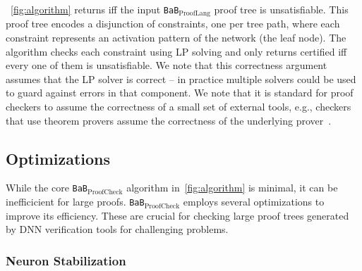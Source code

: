 \documentclass[oneside,11pt,dvipsnames]{book}
\numberwithin{equation}{section}
\theoremstyle{definition}
\theoremstyle{remark}
\newcommand{\prooflang}{\texttt{BaB$_{\text{ProofLang}}$}}
\newcommand{\proofcheck}{\texttt{BaB$_{\text{ProofCheck}}$}}
\begin{document}
~\autoref{fig:algorithm} returns \certified iff the input \prooflang{} proof tree is unsatisfiable. This proof tree encodes a disjunction of constraints, one per tree path, where each constraint represents an activation pattern of the network (the leaf node). The algorithm checks each constraint using LP solving and only returns certified iff every one of them is unsatisfiable.  
We note that this correctness argument assumes that the LP solver is correct -- in practice
multiple solvers could be used to guard against errors in that component.  We note that
it is standard for proof checkers to assume the correctness of a small set of external tools, e.g., checkers that use  theorem provers assume the correctness of the underlying prover~\cite{lammich2023grat}.

\subsection{Optimizations}
While the core \proofcheck{} algorithm in~\autoref{fig:algorithm} is minimal, it can be inefficicient for large proofs.
\proofcheck{} employs several optimizations to improve its efficiency. These are crucial for checking large proof trees generated by DNN verification tools for challenging problems.


\subsubsection{Neuron Stabilization}\label{sec:neuron-stabelization} 
\end{document}
